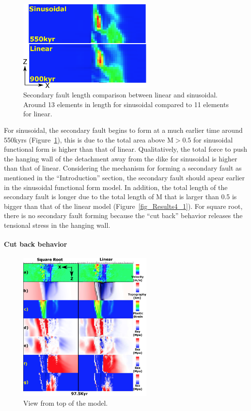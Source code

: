\begin{figure}[hc]
  \centering
    \includegraphics[width=0.6\textwidth]{fig_Results4_2_secondary_fault_length_comparison.eps}
  \caption{Secondary fault length comparison between linear and sinusoidal. Around 13 elements in length for sinusoidal compared to 11 elements for linear.}
 \label{fig_Results4_2}
\end{figure}   

For sinusoidal, the secondary fault begins to form at a much earlier time around 550kyrs (Figure~\ref{fig_Results4_2}), this is due to the total area above M$>0.5$ for sinusoidal functional form is higher than that of linear. Qualitatively, the total force to push the hanging wall of the detachment away from the dike for sinusoidal is higher than that of linear. Considering the mechanism for forming a secondary fault as mentioned in the ``Introduction'' section, the secondary fault should apear earlier in the sinusoidal functional form model. In addition, the total length of the secondary fault is longer due to the total length of M that is larger than 0.5 is bigger than that of the linear model (Figure~\ref{fig_Results4_1}). 
For square root, there is no secondary fault forming because the ``cut back'' behavior releases the tensional stress in the hanging wall.

\paragraph{Cut back behavior}

\begin{figure}[hc]
  \centering
    \includegraphics[width=0.6\textwidth]{fig_Results4_3_sqrt_vs_lin_cut_back_97kyr.eps}
  \caption{View from top of the model.}
 \label{fig_Results4_3_1}
\end{figure}  

